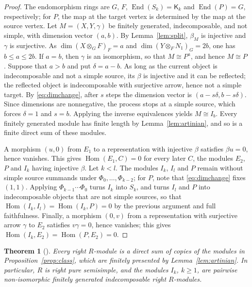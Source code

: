 \documentclass[11pt,a4paper]{amsart}
\newtheorem{theorem}{Theorem}[section]
\numberwithin{equation}{section}
\newcommand{\Hom}{\operatorname{Hom}}
\newcommand{\End}{\operatorname{End}}
\newcommand{\Ksf}{\mathsf{K}}
\begin{document}
\begin{proof}
The endomorphism rings are $G$, $F$, $\End(S_k)=\Ksf_k$ and $\End(P)=G$, respectively; for $P$, the map at the target vertex is determined by the map at the source vertex. Let $M=(X,Y,\gamma)$ be finitely generated, indecomposable, and not simple, with dimension vector $(a,b)$. By Lemma~\ref{lem:split}, $\beta_M$ is injective and $\gamma$ is surjective. As $\dim(X\otimes_GF)_F=a$ and $\dim(Y\otimes_FN_1)_G=2b$, one has $b\le a\le2b$. If $a=b$, then $\gamma$ is an isomorphism, so that $M\cong P^a$, and hence $M\cong P$. Suppose that $a>b$ and put $\delta=a-b$. As long as the current object is indecomposable and not a simple source, its $\beta$ is injective and it can be reflected; the reflected object is indecomposable with surjective arrow, hence not a simple target. By \eqref{eq:dimchange}, after $s$ steps the dimension vector is $(a-s\delta,b-s\delta)$. Since dimensions are nonnegative, the process stops at a simple source, which forces $\delta=1$ and $s=b$. Applying the inverse equivalences yields $M\cong I_b$. Every finitely generated module has finite length by Lemma~\ref{lem:artinian}, and so is a finite direct sum of these modules.

A morphism $(u,0)$ from $E_1$ to a representation with injective $\beta$ satisfies $\beta u=0$, hence vanishes. This gives $\Hom(E_1,C)=0$ for every later $C$, the modules $E_2$, $P$ and $I_k$ having injective $\beta$. Let $k<l$. The modules $I_k$, $I_l$ and $P$ remain without simple source summands under $\Phi_0,\dots,\Phi_{k-2}$; for $P$, note that \eqref{eq:dimchange} fixes $(1,1)$. Applying $\Phi_{k-1}\cdots\Phi_0$ turns $I_k$ into $S_k$, and turns $I_l$ and $P$ into indecomposable objects that are not simple sources, so that $\Hom(I_k,I_l)=\Hom(I_k,P)=0$ by the previous argument and full faithfulness. Finally, a morphism $(0,v)$ from a representation with surjective arrow $\gamma$ to $E_2$ satisfies $v\gamma=0$, hence vanishes; this gives $\Hom(I_k,E_2)=\Hom(P,E_2)=0$.
\end{proof}

\begin{theorem}[{\cite{Si97}}]\label{thm:pss}
Every right $R$-module is a direct sum of copies of the modules in Proposition~\ref{prop:class}, which are finitely presented by Lemma~\ref{lem:artinian}. In particular, $R$ is right pure semisimple, and the modules $I_k$, $k\ge1$, are pairwise non-isomorphic finitely generated indecomposable right $R$-modules.
\end{theorem}
\end{document}
